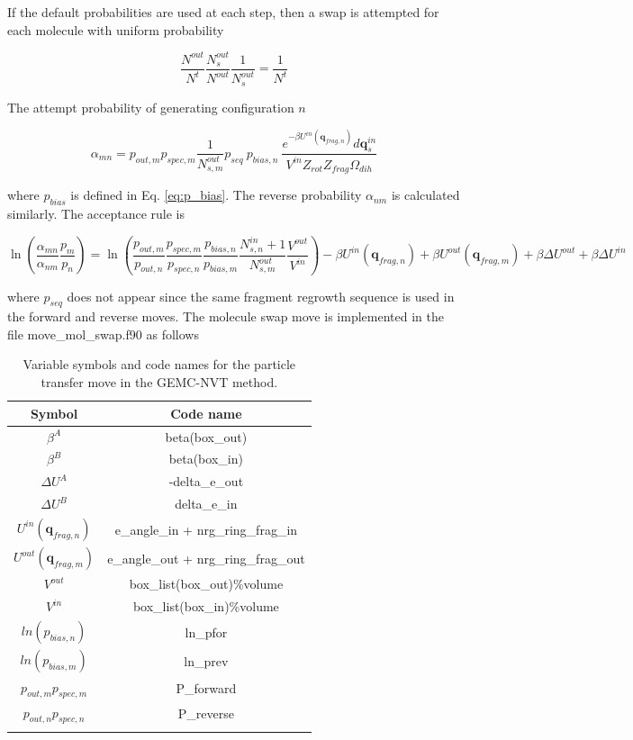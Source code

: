 If the default probabilities are used at each step, then a swap is attempted for each molecule with uniform probability

\begin{equation}
\frac{N^{out}}{N^t} \frac{N^{out}_s}{N^{out}} \frac{1}{N^{out}_s} = \frac{1}{N^t}
\end{equation}

The attempt probability of generating configuration $n$

\begin{equation}
\alpha_{mn} = p_{out,m} p_{spec,m} \frac{1}{N^{out}_{s,m}} p_{seq}\ p_{bias,n}\ 
              \frac{e^{-\beta U^{in}(\mathbf{q}_{frag,n})}d\mathbf{q}_s^{in}}{V^{in}Z_{rot}Z_{frag}\Omega_{dih}}
\label{eq:alpha_mol_swap}
\end{equation}

where $p_{bias}$ is defined in Eq. \ref{eq:p_bias}. The reverse probability $\alpha_{nm}$ is calculated similarly.
The acceptance rule is

\begin{equation}
\ln \left( \frac{\alpha_{mn}}{\alpha_{nm}} \frac{p_m}{p_n} \right) = 
           \ln \left( \frac{p_{out,m}}{p_{out,n}} \frac{p_{spec,m}}{p_{spec,n}} \frac{ p_{bias,n}}{p_{bias,m}} 
                      \frac{N^{in}_{s,n}+1}{N^{out}_{s,m}} \frac{V^{out}}{V^{in}} \right) 
         - \beta U^{in}(\mathbf{q}_{frag,n}) + \beta U^{out}(\mathbf{q}_{frag,m}) + \beta \Delta U^{out} + \beta \Delta U^{in}
\label{eq:pAcc_mol_swap}
\end{equation}

where $p_{seq}$ does not appear since the same fragment regrowth sequence is used in the forward and reverse moves.
The molecule swap move is implemented in the file move\_mol\_swap.f90 as follows

\begin{table}
\caption{Variable symbols and code names for the particle transfer move in the GEMC-NVT method.}
\label{table:gemc_transfer}
\centering
\begin{tabular}{|c|c|} \hline
 {\bf Symbol} & {\bf Code name} \\ \hline
 $\beta^A$ & beta(box\_out) \\
 $\beta^B$ & beta(box\_in) \\
 $\Delta U^A$ & -delta\_e\_out \\
 $\Delta U^B$ & delta\_e\_in \\
 $U^{in}(\mathbf{q}_{frag,n})$ & e\_angle\_in + nrg\_ring\_frag\_in \\
 $U^{out}(\mathbf{q}_{frag,m})$ & e\_angle\_out + nrg\_ring\_frag\_out \\
 $V^{out}$ & box\_list(box\_out)\%volume \\
 $V^{in}$ & box\_list(box\_in)\%volume \\
 $ln(p_{bias,n})$ & ln\_pfor \\
 $ln(p_{bias,m})$ & ln\_prev \\
 $p_{out,m} p_{spec,m}$ & P\_forward \\
 $p_{out,n} p_{spec,n}$ & P\_reverse \\
 \hline
\multicolumn{2}{c}{}
\end{tabular}
\end{table}


